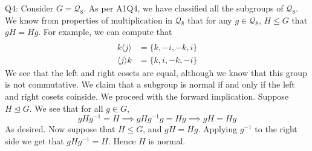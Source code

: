 \documentclass[letterpaper]{article}
\newcommand{\normal}{\trianglelefteq}
\newcommand{\lan}{\langle}
\newcommand{\ran}{\rangle}
\newcommand{\inn}[1]{\lan#1\ran}
\begin{document}
\noindent
Q4: 
Consider $G=\mathcal{Q}_8$. As per A1Q4, we have classified all the subgroups of $\mathcal{Q}_8$. We know from properties of multiplication in $\mathcal{Q}_8$ that for any $g\in \mathcal{Q}_8$, $H \leq G$ that $gH = Hg$. For example, we can compute that 
\begin{align*}
    \\ k \inn{j} &= \{k ,-i, -k, i \}
    \\ \inn{j}k & = \{k,i,-k, -i \}
\end{align*}
We see that the left and right cosets are equal, although we know that this group is not commutative. We claim that a subgroup is normal if and only if the left and right cosets coinside. We proceed with the forward implication. Suppose $H \normal G$. We see that for all $g\in G$, 
$$gHg^{-1} = H \implies gHg^{-1}g = Hg \implies gH = Hg$$
As desired. Now suppose that $H \leq G$, and $gH = Hg$. Applying $g^{-1}$ to the right side we get that $gHg^{-1} = H$. Hence $H$ is normal. 
\end{document}
